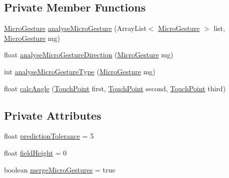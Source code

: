 \subsection*{Private Member Functions}
\begin{DoxyCompactItemize}
\item 
\hyperlink{classch_1_1zhaw_1_1ba10__bsha__1_1_1service_1_1MicroGesture}{MicroGesture} \hyperlink{classch_1_1zhaw_1_1ba10__bsha__1_1_1strategies_1_1MicroGestureDetectionStrategyPrediction_a741f6f5dfadc6a6ad25f03088ff55fc9}{analyseMicroGesture} (ArrayList$<$ \hyperlink{classch_1_1zhaw_1_1ba10__bsha__1_1_1service_1_1MicroGesture}{MicroGesture} $>$ list, \hyperlink{classch_1_1zhaw_1_1ba10__bsha__1_1_1service_1_1MicroGesture}{MicroGesture} mg)
\item 
float \hyperlink{classch_1_1zhaw_1_1ba10__bsha__1_1_1strategies_1_1MicroGestureDetectionStrategyPrediction_aa2db648dc936c5f878575a23b7915347}{analyseMicroGestureDirection} (\hyperlink{classch_1_1zhaw_1_1ba10__bsha__1_1_1service_1_1MicroGesture}{MicroGesture} mg)
\item 
int \hyperlink{classch_1_1zhaw_1_1ba10__bsha__1_1_1strategies_1_1MicroGestureDetectionStrategyPrediction_a7a6bce4151aab292c0e6895257364601}{analyseMicroGestureType} (\hyperlink{classch_1_1zhaw_1_1ba10__bsha__1_1_1service_1_1MicroGesture}{MicroGesture} mg)
\item 
float \hyperlink{classch_1_1zhaw_1_1ba10__bsha__1_1_1strategies_1_1MicroGestureDetectionStrategyPrediction_a853328dde879f43b609cf85e698c64cf}{calcAngle} (\hyperlink{classch_1_1zhaw_1_1ba10__bsha__1_1_1TouchPoint}{TouchPoint} first, \hyperlink{classch_1_1zhaw_1_1ba10__bsha__1_1_1TouchPoint}{TouchPoint} second, \hyperlink{classch_1_1zhaw_1_1ba10__bsha__1_1_1TouchPoint}{TouchPoint} third)
\end{DoxyCompactItemize}
\subsection*{Private Attributes}
\begin{DoxyCompactItemize}
\item 
float \hyperlink{classch_1_1zhaw_1_1ba10__bsha__1_1_1strategies_1_1MicroGestureDetectionStrategyPrediction_ad38574af775edfe073493925952ea556}{predictionTolerance} = 5
\item 
float \hyperlink{classch_1_1zhaw_1_1ba10__bsha__1_1_1strategies_1_1MicroGestureDetectionStrategyPrediction_a310e66b34b2d214baa3e43f64509129a}{fieldHeight} = 0
\item 
boolean \hyperlink{classch_1_1zhaw_1_1ba10__bsha__1_1_1strategies_1_1MicroGestureDetectionStrategyPrediction_afdc3a70a63ee24fa10bc8c77729d5423}{mergeMicroGestures} = true
\end{DoxyCompactItemize}


